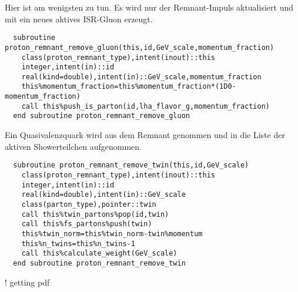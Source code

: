 Hier ist am wenigsten zu tun. Es wird nur der Remnant-Impuls aktualisiert und mit\linebreak {} ein neues aktives ISR-Gluon erzeugt.
\begin{Verbatim}
  subroutine proton_remnant_remove_gluon(this,id,GeV_scale,momentum_fraction)
    class(proton_remnant_type),intent(inout)::this
    integer,intent(in)::id
    real(kind=double),intent(in)::GeV_scale,momentum_fraction
    this%momentum_fraction=this%momentum_fraction*(1D0-momentum_fraction)
    call this%push_is_parton(id,lha_flavor_g,momentum_fraction)
  end subroutine proton_remnant_remove_gluon
\end{Verbatim}
Ein Quasivalenzquark wird aus dem Remnant genommen und in die Liste der aktiven Showerteilchen aufgenommen.
\begin{Verbatim}
  subroutine proton_remnant_remove_twin(this,id,GeV_scale)
    class(proton_remnant_type),intent(inout)::this
    integer,intent(in)::id
    real(kind=double),intent(in)::GeV_scale
    class(parton_type),pointer::twin
    call this%twin_partons%pop(id,twin)
    call this%fs_partons%push(twin)
    this%twin_norm=this%twin_norm-twin%momentum
    this%n_twins=this%n_twins-1
    call this%calculate_weight(GeV_scale)
  end subroutine proton_remnant_remove_twin
\end{Verbatim}
! getting pdf

